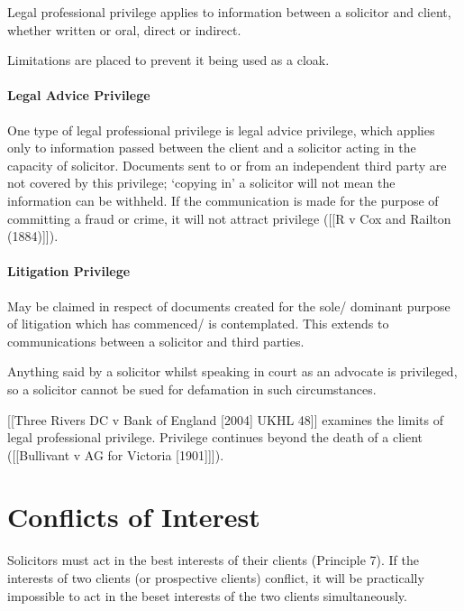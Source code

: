 \documentclass[
]{article}
\begin{document}
Legal professional privilege applies to information between a solicitor
and client, whether written or oral, direct or indirect.

Limitations are placed to prevent it being used as a cloak.

\hypertarget{legal-advice-privilege}{%
\paragraph{Legal Advice Privilege}\label{legal-advice-privilege}}

One type of legal professional privilege is legal advice privilege,
which applies only to information passed between the client and a
solicitor acting in the capacity of solicitor. Documents sent to or from
an independent third party are not covered by this privilege; `copying
in' a solicitor will not mean the information can be withheld. If the
communication is made for the purpose of committing a fraud or crime, it
will not attract privilege ({[}{[}R v Cox and Railton (1884){]}{]}).

\hypertarget{litigation-privilege}{%
\paragraph{Litigation Privilege}\label{litigation-privilege}}

May be claimed in respect of documents created for the sole/ dominant
purpose of litigation which has commenced/ is contemplated. This extends
to communications between a solicitor and third parties.

Anything said by a solicitor whilst speaking in court as an advocate is
privileged, so a solicitor cannot be sued for defamation in such
circumstances.

{[}{[}Three Rivers DC v Bank of England {[}2004{]} UKHL 48{]}{]}
examines the limits of legal professional privilege. Privilege continues
beyond the death of a client ({[}{[}Bullivant v AG for Victoria
{[}1901{]}{]}{]}).

\hypertarget{conflicts-of-interest}{%
\section{Conflicts of Interest}\label{conflicts-of-interest}}

Solicitors must act in the best interests of their clients (Principle
7). If the interests of two clients (or prospective clients) conflict,
it will be practically impossible to act in the beset interests of the
two clients simultaneously.
\end{document}
